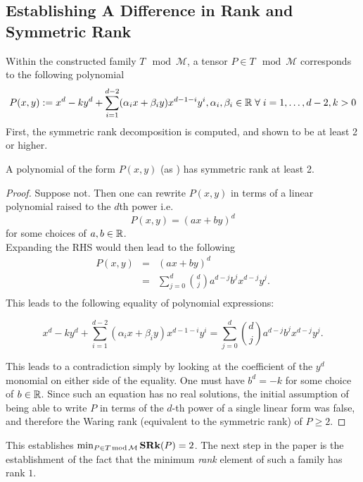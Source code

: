 \documentclass[../Lael_John_MasterThesis_Draft.tex]{subfiles}
\begin{document}
\subsection*{Establishing A Difference in Rank and Symmetric Rank}
Within the constructed family $T\mod\mathcal{M}$, a tensor $P \in T\mod\mathcal{M}$ corresponds to the following polynomial \begin{equation}\label{eqn:orderdelementinconstructedfamily}
    P(x,y) := x^d - ky^d + \sum_{i=1}^{d-2} (\alpha_i x + \beta_i y)x^{d-1-i}y^i,
    \alpha_i, \beta_i \in \mathbb{R} \;\forall\; i = 1,\ldots,d-2, k > 0 
\end{equation} 
First, the symmetric rank decomposition is computed, and shown to be at least 2 or higher. 
\begin{proposition}
    A polynomial of the form $P(x,y)$ (as ) has symmetric rank at least 2. 
\end{proposition}\label{prop:srankatleast2}
\begin{proof}
    Suppose not. Then one can rewrite $P(x,y)$ in terms of a linear polynomial raised to the $d$th power i.e.
    $$P(x,y) = (ax + by)^d$$for some choices of $a,b \in \mathbb{R}$.\\ Expanding the RHS would then lead to the following 
    \begin{eqnarray*}
        P(x,y) &=& (ax + by)^d\\
        &=& \sum_{j=0}^{d}\binom{d}{j} a^{d-j}b^jx^{d-j}y^j.\\ 
    \end{eqnarray*}This leads to the following equality of polynomial expressions:
    
    $$x^d - ky^d + \sum_{i=1}^{d-2} (\alpha_i x + \beta_i y)x^{d-1-i}y^i = \sum_{j=0}^{d}\binom{d}{j} a^{d-j}b^jx^{d-j}y^j.$$
    
    This leads to a contradiction simply by looking at the coefficient of the $y^d$ monomial on either side of the equality. One must have $b^d = -k$ for some choice of $b \in \mathbb{R}$.
    Since such an equation has no real solutions, the initial assumption of being able to write $P$ in terms of the $d$-th power of a single linear form was false, and therefore the Waring rank (equivalent to the symmetric rank) of $P \geq 2$.
\end{proof}
This establishes $\min_{P \in T\text{\,mod\,}\mathcal{M}} \textbf{SRk}(P) = 2$. The next step in the paper is the establishment of the fact that the minimum \textit{rank} element of such a family has rank $1$.
\end{document}
